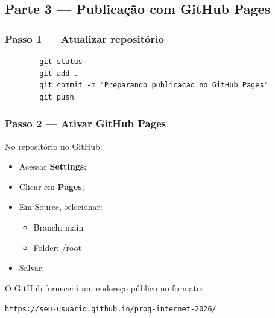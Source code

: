 \documentclass[12pt,a4paper]{article}
\begin{document}
            
    \subsection{Parte 3 — Publicação com GitHub Pages}
        \subsubsection{Passo 1 — Atualizar repositório}
        
        \begin{boxCodigo}
        \begin{verbatim}
        git status
        git add .
        git commit -m "Preparando publicacao no GitHub Pages"
        git push
        \end{verbatim}
        \end{boxCodigo}
        
        \subsubsection{Passo 2 — Ativar GitHub Pages}
        
        No repositório no GitHub:
        
        \begin{itemize}
        \item Acessar \textbf{Settings};
        \item Clicar em \textbf{Pages};
        \item Em Source, selecionar:
            \begin{itemize}
                \item Branch: main
                \item Folder: /root
            \end{itemize}
        \item Salvar.
        \end{itemize}
        
        O GitHub fornecerá um endereço público no formato:
        
        \texttt{https://seu-usuario.github.io/prog-internet-2026/}
        
        
\end{document}
